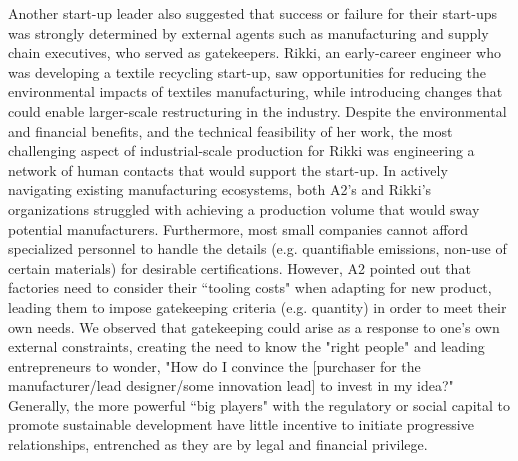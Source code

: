 Another start-up leader also suggested that success or failure for their start-ups was strongly determined by external agents such as manufacturing and supply chain executives, who served as gatekeepers. Rikki, an early-career engineer who was developing a textile recycling start-up, saw opportunities for reducing the environmental impacts of textiles manufacturing, while introducing changes that could enable larger-scale restructuring in the industry. Despite the environmental and financial benefits, and the technical feasibility of her work, the most challenging aspect of industrial-scale production for Rikki was engineering a network of human contacts that would support the start-up. In actively navigating existing manufacturing ecosystems, both A2's and Rikki's organizations struggled with achieving a production volume that would sway potential manufacturers. Furthermore, most small companies cannot afford specialized personnel to handle the details (e.g. quantifiable emissions, non-use of certain materials) for desirable certifications. However, A2 pointed out that factories need to consider their ``tooling costs" when adapting for new product, leading them to impose gatekeeping criteria (e.g. quantity) in order to meet their own needs. We observed that gatekeeping could arise as a response to one's own external constraints, creating the need to know the "right people" and leading entrepreneurs to wonder, "How do I convince the [purchaser for the manufacturer/lead designer/some innovation lead] to invest in my idea?" Generally, the more powerful ``big players" with the regulatory or social capital to promote sustainable development have little incentive to initiate progressive relationships, entrenched as they are by legal and financial privilege.

